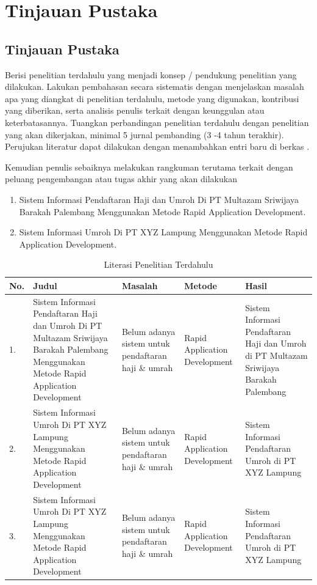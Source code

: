 \newpage
\chapter{Tinjauan Pustaka} \label{Bab II}

\section{Tinjauan Pustaka} \label{II.Tinjauan}
Berisi penelitian terdahulu yang menjadi konsep / pendukung penelitian yang dilakukan. Lakukan pembahasan secara sistematis dengan menjelaskan masalah apa yang diangkat di penelitian terdahulu, metode yang digunakan, kontribusi yang diberikan, serta analisis penulis terkait dengan keunggulan atau keterbatasannya. Tuangkan perbandingan penelitian terdahulu dengan penelitian yang akan dikerjakan, minimal 5 jurnal pembanding (3 -4 tahun terakhir). Perujukan literatur dapat dilakukan dengan menambahkan entri baru di berkas \cite{knuth2001art}. \par

Kemudian penulis sebaiknya melakukan rangkuman terutama terkait dengan peluang pengembangan atau tugas akhir yang akan dilakukan \par

\begin{enumerate}[noitemsep]
	\item Sistem Informasi Pendaftaran Haji dan Umroh Di PT Multazam Sriwijaya Barakah Palembang Menggunakan Metode Rapid Application Development. \blindtext
	\item Sistem Informasi Umroh Di PT XYZ Lampung Menggunakan Metode Rapid Application Development. \blindtext
\end{enumerate}

\begin{longtable}{| b{}|p{}|p{}|p{}|p{}|} %
	\caption{Literasi Penelitian Terdahulu}
	\label{table:2.literasi}\\
	\hline
	No. & Judul & Masalah & Metode & Hasil \\
	\hline
	\endhead %
	1. & Sistem Informasi Pendaftaran Haji dan Umroh Di PT Multazam Sriwijaya Barakah Palembang Menggunakan Metode Rapid Application Development & Belum adanya sistem untuk pendaftaran haji \& umrah & Rapid Application Development & Sistem Informasi Pendaftaran Haji dan Umroh di PT Multazam Sriwijaya Barakah Palembang\\ 
	\hline
	2. & Sistem Informasi Umroh Di PT XYZ Lampung Menggunakan Metode Rapid Application Development & Belum adanya sistem untuk pendaftaran haji \& umrah & Rapid Application Development & Sistem Informasi Pendaftaran Umroh di PT XYZ Lampung\\ 
	\hline
	3. & Sistem Informasi Umroh Di PT XYZ Lampung Menggunakan Metode Rapid Application Development & Belum adanya sistem untuk pendaftaran haji \& umrah & Rapid Application Development & Sistem Informasi Pendaftaran Umroh di PT XYZ Lampung\\ 
	\hline
\end{longtable}

